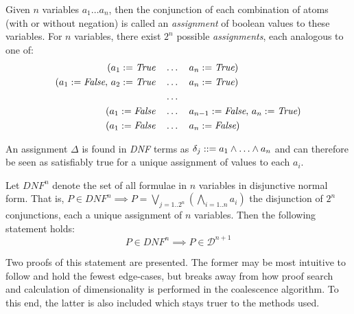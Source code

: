     \begin{definition*}[Assignments]
        Given $n$ variables $a_1 \ldots a_n$, then the conjunction of each combination of atoms (with or without negation) is called an \textit{assignment} of boolean values to these variables.
        For $n$ variables, there exist $2^n$ possible \textit{assignments}, each analogous to one of:
        \begin{align*}
            (a_1 := \textit{True} \quad &\ldots \quad a_n := \textit{True}) \\
            (a_1 := \textit{False}, \, a_2 := \textit{True} \quad &\ldots \quad a_n := \textit{True}) \\
            &\ldots \\
            (a_1 := \textit{False} \quad &\ldots \quad a_{n-1} := \textit{False}, \, a_n := \textit{True}) \\
            (a_1 := \textit{False} \quad &\ldots \quad a_n := \textit{False})
        \end{align*}

        An assignment $\Delta$ is found in \textit{DNF} terms as $\delta_j ::= a_1 \wedge \ldots \wedge a_n$ and can therefore be seen as satisfiably true for a unique assignment of values to each $a_i$.
    \end{definition*}
    
    \begin{proposition}\label{propn:dimensionality-bounds}
        Let $\textit{DNF}^n$ denote the set of all formulae in $n$ variables in disjunctive normal form.
        That is, $P \in \textit{DNF}^n \implies P = \bigvee_{j = 1 .. 2^n} (\bigwedge_{i = 1 .. n} a_i)$ the disjunction of $2^n$ conjunctions, each a unique assignment of $n$ variables.
        Then the following statement holds:
        \begin{equation*}
            P \in \textit{DNF}^n \implies P \in \mathcal{D}^{n+1}
        \end{equation*}
    \end{proposition}

    Two proofs of this statement are presented.
    The former may be most intuitive to follow and hold the fewest edge-cases, but breaks away from how proof search and calculation of dimensionality is performed in the coalescence algorithm.
    To this end, the latter is also included which stays truer to the methods used.

